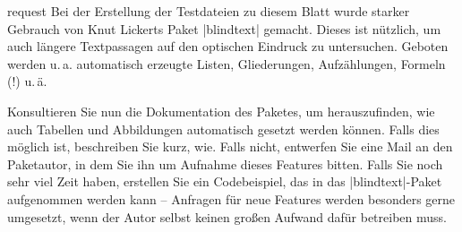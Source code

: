 \documentclass[
	solution,
	blatt=9,
	ausgabe=12.\,06.\,2010,
	rückgabe=18.\,06.\,2010
]{lcourse-hd}
\begin{document}
\begin{expertexercise}[
  name={Feature Request},
  abgabe = Handschriftliche Erklärung der Funktionsweise bzw. fiktive Mail ausgedruckt.
]{request}
Bei der Erstellung der Testdateien zu diesem Blatt wurde starker Gebrauch von Knut Lickerts Paket |blindtext| gemacht. Dieses ist nützlich, um auch längere Textpassagen auf den optischen Eindruck zu untersuchen. Geboten werden u.\,a. automatisch erzeugte Listen, Gliederungen, Aufzählungen, Formeln (!) u.\,ä.

Konsultieren Sie nun die Dokumentation des Paketes, um herauszufinden, wie auch Tabellen und Abbildungen automatisch gesetzt werden können. Falls dies möglich ist, beschreiben Sie kurz, wie. Falls nicht, entwerfen Sie eine Mail an den Paketautor, in dem Sie ihn um Aufnahme dieses Features bitten. Falls Sie noch sehr viel Zeit haben, erstellen Sie ein Codebeispiel, das in das |blindtext|-Paket aufgenommen werden kann – Anfragen für neue Features werden besonders gerne umgesetzt, wenn der Autor selbst keinen großen Aufwand dafür betreiben muss.
\end{expertexercise}
\end{document}
